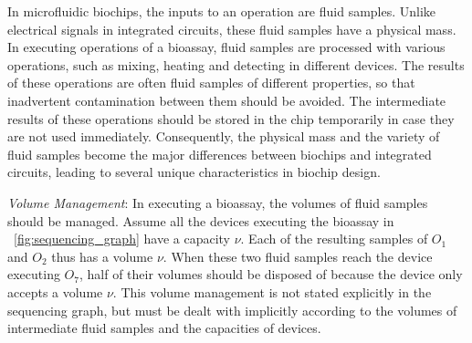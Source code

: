 In microfluidic biochips, the inputs to an operation are fluid samples. 
Unlike electrical signals in integrated circuits, these fluid samples 
have a physical mass.  
In executing operations of a bioassay, 
fluid samples are processed with various operations, 
such as mixing, heating and detecting in different devices. 
The results of these operations are often fluid samples of different
properties, so that inadvertent contamination between them should be avoided. 
The intermediate
results of these operations should be stored in the chip temporarily in case
they are not used immediately.
Consequently, the physical mass and the variety of fluid samples 
become the major differences between biochips and 
integrated circuits, leading to several unique
characteristics in biochip design.

\textit{Volume Management}: In executing a bioassay, 
the volumes of fluid samples should be managed.
Assume all the devices executing the bioassay in
\figname~\ref{fig:sequencing_graph}
have a capacity $\nu$. Each of the resulting samples of $O_1$ and $O_2$ thus has a
volume $\nu$. When these two fluid samples reach the device executing
$O_7$, half of their volumes should be disposed of because the device only 
accepts a volume $\nu$.
This volume management is not stated explicitly in the sequencing graph, but 
must be dealt with implicitly according to the volumes of intermediate fluid 
samples and the capacities of devices.    

